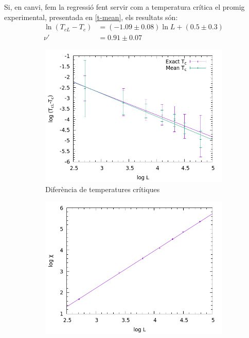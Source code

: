 \documentclass[a4paper]{article}
\begin{document}
Si, en canvi, fem la regressió fent servir com a temperatura crítica el promig experimental, presentada en \eqref{t-mean}, els resultats són:
\begin{align*}
    \ln \left(T_{cL} - T_c \right) &= (-1.09 \pm 0.08) \ln L + (0.5 \pm 0.3) \\
	\nu' &= 0.91 \pm 0.07
\end{align*}

\begin{figure}[H]
    \centering
    \begin{subfigure}{.45\textwidth}
        \centering
        \includegraphics[width=\textwidth]{coefs-nu.png}
        \caption{Diferència de temperatures crítiques}
        \label{fig:coefs-nu}
    \end{subfigure}
    \begin{subfigure}{.45\textwidth}
        \centering
        \includegraphics[width=\textwidth]{coefs-gammanu.png}

\end{subfigure}
\end{figure}
\end{document}
